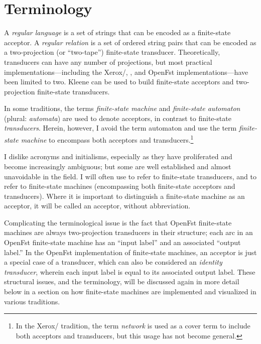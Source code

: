 \section{Terminology}

A \emph{regular language} is a set of strings that can be encoded as a
finite-state acceptor.  A \emph{regular relation}
is a set of ordered string pairs that can be
encoded as a two-projection (or ``two-tape'') finite-state transducer.
Theoretically, transducers can have any number of projections, but most
practical implementations---including the
Xerox/, ,  and OpenFst implementations---have been limited to two.  Kleene can be used to build finite-state acceptors
and two-projection finite-state transducers.

In some traditions, the terms \emph{finite-state machine} and \emph{finite-state automaton}
(plural: \emph{automata}) are used to
denote acceptors, in contrast to finite-state \emph{transducers}.  Herein, however, I avoid the
term automaton and use the term \emph{finite-state machine} to encompass both
acceptors and transducers.\footnote{In the Xerox/ tradition, the term
\emph{network} is used as a cover term to include both acceptors and transducers, but this
usage has not become general.}

I dislike acronyms and initialisms, especially as they have proliferated and become
increasingly
ambiguous; but some are well established and almost unavoidable in the field.  I will often use
\emph{\fst{}} to refer to finite-state transducers, and \emph{\fsm{}} to refer to finite-state machines
(encompassing both finite-state acceptors and transducers).
Where it is important to distinguish a finite-state machine as an acceptor, it will be
called an acceptor, without abbreviation.

Complicating the terminological issue is the fact that OpenFst finite-state machines are always two-projection
transducers in their structure; each arc in an OpenFst finite-state machine has an ``input
label'' and an associated ``output label.''  In the OpenFst
implementation of finite-state machines, an acceptor is just a special
case of a transducer, which can also be considered an \emph{identity transducer}, wherein each input label is equal to
its associated output label.  These structural issues, and the terminology, will be
discussed again in more detail below in a section on how finite-state machines are
implemented and visualized in various traditions.


